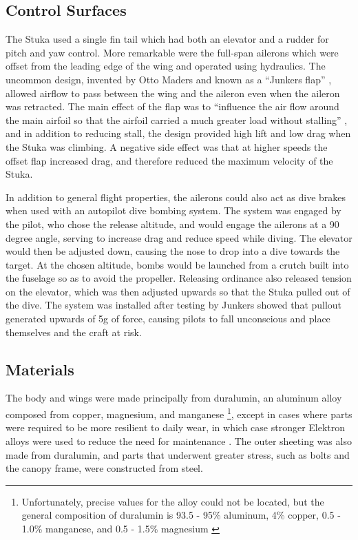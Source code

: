 \documentclass[a4paper, fontsize=11pt]{scrartcl} %
\begin{document}
\subsection{Control Surfaces}
The Stuka used a single fin tail which had both an elevator and a
rudder for pitch and yaw control. More remarkable were the full-span ailerons
which were offset from the leading edge of the wing and operated using hydraulics. The uncommon design,
invented by Otto Maders and known as a ``Junkers flap'' \autocite{}, allowed airflow to pass
between the wing and the aileron even when the aileron was retracted.
The main effect of the flap was to ``influence the air flow around the main airfoil so
that the airfoil carried a much greater load without stalling''
\autocite[p~.14]{wenzinger38}, and in addition to reducing stall, the design
provided high lift and low drag when the Stuka was climbing. A negative
side effect was that at higher speeds the offset flap increased drag,
and therefore reduced the maximum velocity of the Stuka.

In addition to general flight properties, the ailerons could also act as
dive brakes when used with an autopilot dive bombing system. The system was engaged
by the pilot, who chose the release altitude, and would engage the ailerons at a 90 degree angle,
serving to increase drag and reduce speed while diving. The elevator
would then be adjusted down, causing the nose to drop into a dive
towards the target. At the chosen altitude, bombs would be launched from
a crutch built into the fuselage so as to avoid the propeller. Releasing
ordinance also released tension on the elevator, which was then adjusted
upwards so that the Stuka pulled out of the dive.
The system was installed after testing by Junkers showed that pullout
generated upwards of 5g of force, causing pilots to fall unconscious and
place themselves and the craft at risk.

\subsection{Materials}

The body and wings were made principally from
duralumin, an aluminum alloy composed from copper, magnesium, and
manganese
\footnote{Unfortunately, precise values for the alloy could not
  be located, but the general composition of duralumin is 93.5 - 95\% aluminum, 4\%
  copper, 0.5 - 1.0\% manganese, and 0.5 - 1.5\%
  magnesium \autocite[p.~102-103]{wardlaw33}
}, except in cases where parts were required to be more resilient to daily
wear, in which case stronger Elektron alloys were used to reduce the
need for maintenance \autocite[p.~15]{guardia14}. The outer sheeting was
also made from duralumin, and parts that underwent greater stress, such
as bolts and the canopy frame, were constructed from steel.
\end{document}
